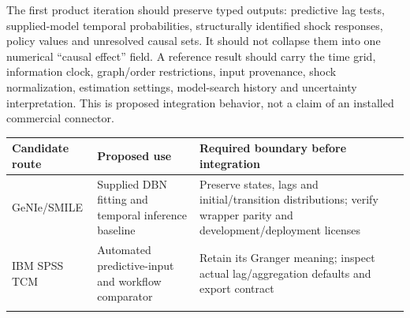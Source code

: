 The first product iteration should preserve typed outputs: predictive
lag tests, supplied-model temporal probabilities, structurally
identified shock responses, policy values and unresolved causal sets. It
should not collapse them into one numerical ``causal effect'' field. A
reference result should carry the time grid, information clock,
graph/order restrictions, input provenance, shock normalization,
estimation settings, model-search history and uncertainty
interpretation. This is proposed integration behavior, not a claim of an
installed commercial connector.

\begin{longtable}[]{@{}lll@{}}
\toprule
\begin{minipage}[b]{0.30\columnwidth}\raggedright
Candidate route\strut
\end{minipage} & \begin{minipage}[b]{0.30\columnwidth}\raggedright
Proposed use\strut
\end{minipage} & \begin{minipage}[b]{0.30\columnwidth}\raggedright
Required boundary before integration\strut
\end{minipage}\tabularnewline
\midrule
\endhead
\begin{minipage}[t]{0.30\columnwidth}\raggedright
GeNIe/SMILE\strut
\end{minipage} & \begin{minipage}[t]{0.30\columnwidth}\raggedright
Supplied DBN fitting and temporal inference baseline\strut
\end{minipage} & \begin{minipage}[t]{0.30\columnwidth}\raggedright
Preserve states, lags and initial/transition distributions; verify
wrapper parity and development/deployment licenses\strut
\end{minipage}\tabularnewline
\begin{minipage}[t]{0.30\columnwidth}\raggedright
IBM SPSS TCM\strut
\end{minipage} & \begin{minipage}[t]{0.30\columnwidth}\raggedright
Automated predictive-input and workflow comparator\strut
\end{minipage} & \begin{minipage}[t]{0.30\columnwidth}\raggedright
Retain its Granger meaning; inspect actual lag/aggregation defaults and
export contract\strut
\end{minipage}\tabularnewline
\begin{minipage}[t]{0.30\columnwidth}\raggedright

\end{minipage}
\end{longtable}
